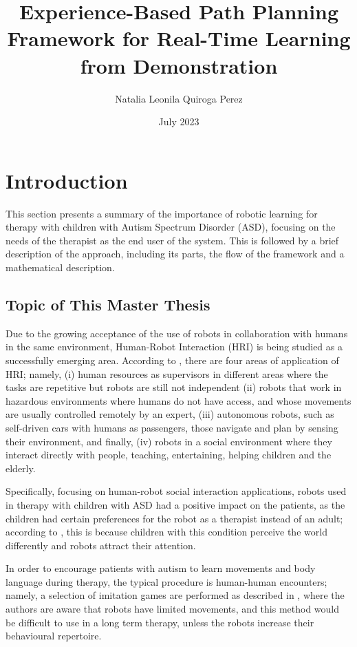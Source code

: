 \documentclass[thesis]{mas_proposal}
\title{Experience-Based Path Planning Framework for Real-Time Learning from Demonstration}
\author{Natalia Leonila Quiroga Perez}
\date{July 2023}
\begin{document}
\maketitle

\pagestyle{plain}

\section{Introduction}

	This section presents a summary of the importance of robotic learning for therapy with children with Autism Spectrum Disorder (ASD), focusing on the needs of the therapist as the end user of the system. This is followed by a brief description of the approach, including its parts, the flow of the framework and a mathematical description.
	
	\subsection{Topic of This Master Thesis}

    Due to the growing acceptance of the use of robots in collaboration with humans in the same environment, Human-Robot Interaction (HRI) is being studied as a successfully emerging area. According to \cite{Sheridan2016}, there are four areas of application of HRI; namely, (i) human resources as supervisors in different areas where the tasks are repetitive but robots are still not independent (ii) robots that work in hazardous environments where humans do not have access, and whose movements are usually controlled remotely by an expert, (iii) autonomous robots, such as self-driven cars with humans as passengers, those navigate and plan by sensing their environment, and finally, (iv) robots in a social environment where they interact directly with people, teaching, entertaining, helping children and the elderly.
    
    Specifically, focusing on human-robot social interaction applications, robots used in therapy with children with ASD had a positive impact on the patients, as the children had certain preferences for the robot as a therapist instead of an adult; according to \cite{Prabha2019}, this is because children with this condition perceive the world differently and robots attract their attention.
    
    In order to encourage patients with autism to learn movements and body language during therapy, the typical procedure is human-human encounters; namely, a selection of imitation games are performed as described in \cite{Dautenhahn2004}, where the authors are aware that robots have limited movements, and this method would be difficult to use in a long term therapy, unless the robots increase their behavioural repertoire.
    
\end{document}
